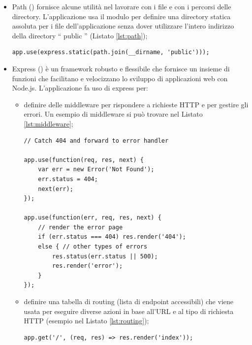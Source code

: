 \documentclass[12pt]{report}
\begin{document}
\begin{itemize}
	\item Path (\cite{path}) fornisce alcune utilità nel lavorare con i file e con i percorsi delle directory. L'applicazione usa il modulo per definire una directory statica assoluta per i file dell'applicazione senza dover utilizzare l'intero indirizzo della directory \textquotedblleft{} public \textquotedblright{} (Listato \ref{lst:path});
\begin{lstlisting}[caption={Uso del modulo \emph{path}.}, label={lst:path}, xleftmargin=\dimexpr-\leftmargini]
app.use(express.static(path.join(__dirname, 'public')));
\end{lstlisting}

	\item Express (\cite{express}) è un framework robusto e flessibile che fornisce un insieme di funzioni che facilitano e velocizzano lo sviluppo di applicazioni web con Node.js. L'applicazione fa uso di express per:
	\begin{itemize}
		\item definire delle middleware per rispondere a richieste HTTP e per gestire gli errori. Un esempio di middleware si può trovare nel Listato \ref{lst:middleware}; 
\begin{lstlisting}[caption={Middleware per caricare la pagina \textquotedblleft{} 404.ejs \textquotedblright{} nel caso in cui un utente provi ad accedere ad una pagina non esistente}, label={lst:middleware}, xleftmargin=\dimexpr-\leftmarginii-\leftmargini]
// Catch 404 and forward to error handler

app.use(function(req, res, next) {
	var err = new Error('Not Found');
	err.status = 404;
	next(err);
});
	
app.use(function(err, req, res, next) {
	// render the error page
	if (err.status === 404) res.render('404');
	else { // other types of errors
		res.status(err.status || 500);
		res.render('error');
	}
});
\end{lstlisting}

		\item definire una tabella di routing (lista di endpoint accessibili) che viene usata per eseguire diverse azioni in base all'URL e al tipo di richiesta HTTP (esempio nel Listato \ref{lst:routing});
\begin{lstlisting}[caption={Implementazione di un endpoint. Quando viene fatta una richiesta GET all'endpoint \emph{\textquotedblleft{} / \textquotedblright{}} allora, come risposta, l'applicazione invia all'utente un file chiamato \textquotedblleft{} index.ejs \textquotedblright{} (che rappresenta la homepage) che viene poi caricato dal suo browser}, label={lst:routing}, xleftmargin=\dimexpr-\leftmarginii-\leftmargini]
app.get('/', (req, res) => res.render('index'));
\end{lstlisting}


\end{itemize}
\end{itemize}
\end{document}
